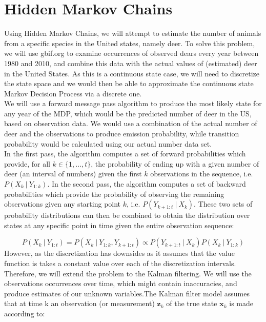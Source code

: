 \documentclass[12pt]{article}
\begin{document}
\section*{Hidden Markov Chains}
Using Hidden Markov Chains, we will attempt to estimate the number of animals from a specific species in the United states, namely deer. To solve this problem, we will use gbif.org to examine occurrences of observed dears every year between 1980 and 2010, and combine this data with the actual values of (estimated) deer in the United States.  As this is a continuous state case, we will need to discretize the state space and we would then be able to approximate the continuous state Markov Decision Process via a discrete one.\\

\noindent We will use a forward message pass algorithm to produce the most likely state for any year of the MDP, which would be the predicted number of deer in the US, based on observation data.  We would use a combination of the actual number of deer and the observations to produce emission probability, while transition probability would be calculated using our actual number data set.\\ 

\noindent In the first pass, the algorithm computes a set of forward probabilities which provide, for all $k \in \{1, \dots, t\}$, the probability of ending up with a given number of deer (an interval of numbers) given the first $k$ observations in the sequence, i.e. $P(X_k\ |\  Y_{1:k})$. In the second pass, the algorithm computes a set of backward probabilities which provide the probability of observing the remaining observations given any starting point $k$, i.e. $P(Y_{k+1:t}\ |\ X_k)$. These two sets of probability distributions can then be combined to obtain the distribution over states at any specific point in time given the entire observation sequence: 

$$P(X_k\ |\ Y_{1:t}) = P(X_k\ |\ Y_{1:k}, Y_{k+1:t}) \propto P(Y_{k+1:t}\ |\ X_k) P(X_k\ |\ Y_{1:k})$$
\noindent However, as the discretization has downsides as it assumes that the value function is takes a constant value over each of the discretization intervals.\\

\noindent Therefore, we will extend the problem to the Kalman filtering. We will use the observations occurrences over time, which might contain inaccuracies, and produce estimates of our unknown variables.The Kalman filter model assumes that at time k an observation (or measurement) $\mathbf{z}_{k}$ of the true state $\mathbf{x}_{k}$ is made according to:
\end{document}

